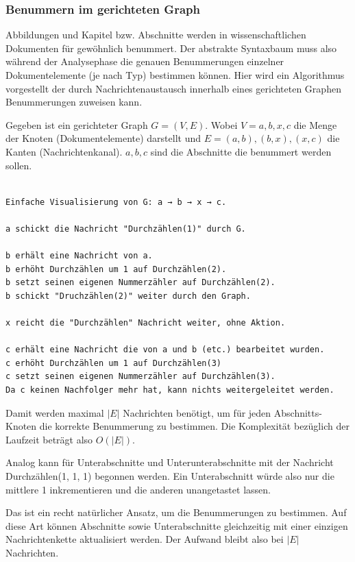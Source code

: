  
\subsubsection{Benummern im gerichteten Graph}\label{}

 
Abbildungen und Kapitel bzw. Abschnitte werden in wissenschaftlichen Dokumenten für gewöhnlich benummert. Der abstrakte Syntaxbaum muss also während der Analysephase die genauen Benummerungen einzelner Dokumentelemente (je nach Typ) bestimmen können. Hier wird ein Algorithmus vorgestellt der durch Nachrichtenaustausch innerhalb eines gerichteten Graphen Benummerungen zuweisen kann.

 
Gegeben ist ein gerichteter Graph \(G = (V, E)\). Wobei \(V = { a, b, x, c }\) die Menge der Knoten (Dokumentelemente) darstellt und \(E = { (a,b), (b,x), (x,c) }\) die Kanten (Nachrichtenkanal). \({ a, b, c }\) sind die Abschnitte die benummert werden sollen.

 
\begin{verbatim}

Einfache Visualisierung von G: a → b → x → c.

a schickt die Nachricht "Durchzählen(1)" durch G.

b erhält eine Nachricht von a.
b erhöht Durchzählen um 1 auf Durchzählen(2).
b setzt seinen eigenen Nummerzähler auf Durchzählen(2).
b schickt "Druchzählen(2)" weiter durch den Graph.

x reicht die "Durchzählen" Nachricht weiter, ohne Aktion.

c erhält eine Nachricht die von a und b (etc.) bearbeitet wurden.
c erhöht Durchzählen um 1 auf Durchzählen(3)
c setzt seinen eigenen Nummerzähler auf Durchzählen(3).
Da c keinen Nachfolger mehr hat, kann nichts weitergeleitet werden.
\end{verbatim}
 
Damit werden maximal \(|E|\) Nachrichten benötigt, um für jeden Abschnitts-Knoten die korrekte Benummerung zu bestimmen. Die Komplexität bezüglich der Laufzeit beträgt also \(O(|E|)\).

 
Analog kann für Unterabschnitte und Unterunterabschnitte mit der Nachricht Durchzählen(1, 1, 1) begonnen werden. Ein Unterabschnitt würde also nur die mittlere 1 inkrementieren und die anderen unangetastet lassen.

 
Das ist ein recht natürlicher Ansatz, um die Benummerungen zu bestimmen. Auf diese Art können Abschnitte sowie Unterabschnitte gleichzeitig mit einer einzigen Nachrichtenkette aktualisiert werden. Der Aufwand bleibt also bei \(|E|\) Nachrichten.

